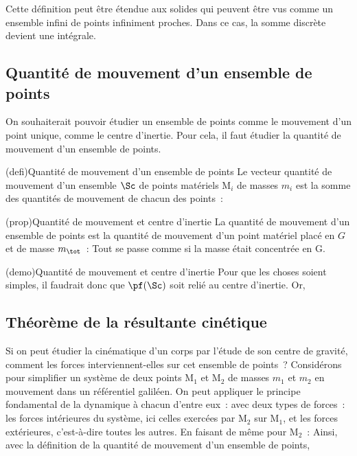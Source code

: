 \documentclass[../../main/main.tex]{subfiles}
\begin{document}
Cette définition peut être étendue aux solides qui peuvent être vus comme un
ensemble infini de points infiniment proches. Dans ce cas, la somme discrète
devient une intégrale.

\subsection{Quantité de mouvement d'un ensemble de points}

On souhaiterait pouvoir étudier un ensemble de points comme le mouvement d'un
point unique, comme le centre d'inertie. Pour cela, il faut étudier la quantité
de mouvement d'un ensemble de points.

\begin{tcb*}(defi){Quantité de mouvement d'un ensemble de points}
	Le vecteur quantité de mouvement d'un ensemble $\Sc$ de points matériels
	M$_i$ de masses $m_i$ est la somme des quantités de mouvement de chacun des
	points~:
	\psw{%
		\[
			\boxed{\pf(\Sc) = \sum_i m_i \vf(\Mr_i)}
		\]
	}
\end{tcb*}

\begin{tcb*}(prop){Quantité de mouvement et centre d'inertie}
	La quantité de mouvement d'un ensemble de points est la quantité de
	mouvement d'un point matériel placé en $G$ et de masse $m_{\tot}$~:
	\psw{%
		\[
			\boxed{\pf (\Sc) = m_{\tot}\vf (\Gr)}
		\]
	}
	Tout se passe comme si la masse était concentrée en G.
\end{tcb*}

\begin{tcb*}(demo){Quantité de mouvement et centre d'inertie}
	Pour que les choses soient simples, il faudrait donc que $\pf(\Sc)$ soit relié
	au centre d'inertie. Or,
	\psw{%
		\[
			\vf(\Gr) = \dv{\vv{\rm OG}}{t} = \frac{1}{m_{\tot}}
			\underbracket[1pt]{\sum_i m_i \dv{{\OM}_i}{t}}_{\pf(\Sc)}
			\Lra
			\boxed{\pf(\Sc) = m_{\tot}\vf(\Gr)}
		\]
	}
\end{tcb*}

\subsection{Théorème de la résultante cinétique}
Si on peut étudier la cinématique d'un corps par l'étude de son centre de
gravité, comment les forces interviennent-elles sur cet ensemble de points~?
Considérons pour simplifier un système de deux points M$_1$ et M$_2$ de masses
$m_1$ et $m_2$ en mouvement dans un référentiel galiléen. On peut appliquer le
principe fondamental de la dynamique à chacun d'entre eux~:
\psw{%
	\[\dv{\pf(\Mr_1)}{t} = \Ff_{\Mr_2\ra\Mr_1} + \Ff_{\ext\ra\Mr_1}\]
}
avec deux types de forces~: les forces intérieures du système, ici celles
exercées par M$_2$ sur M$_1$, et les forces extérieures, c'est-à-dire toutes les
autres. En faisant de même pour M$_2$~:
\psw{%
	\[\dv{\pf(\Mr_2)}{t} = \Ff_{\Mr_1\ra\Mr_2} + \Ff_{\ext\ra\Mr_2}\]
}
Ainsi, avec la définition de la quantité de mouvement d'un ensemble de points,
\psw{%
	\[
		\dv{\pf(\Sc)}{t} =
		\underbracket[1pt]{\Ff_{\Mr_1\ra\Mr_2}+\Ff_{\Mr_2\ra\Mr_1}}_{= \of
			\text{ d'après la 3ème loi}} + \Ff_{\ext\ra\Mr_1} + \Ff_{\ext\ra\Mr_2}\]
}
\end{document}

